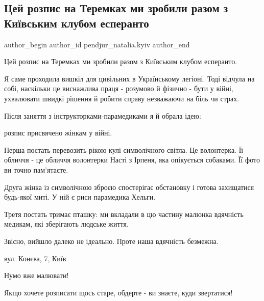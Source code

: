  
 
 
 
 

\subsection{Цей розпис на Теремках ми зробили разом з Київським клубом есперанто}
\label{sec:17_07_2023.fb.pendjur_natalia.kyiv.1.rozpys_na_teremkah_kyiv_klub_esperanto}

\ifcmt
 author_begin
   author_id pendjur_natalia.kyiv
 author_end
\fi

Цей розпис на Теремках ми зробили разом з Київським клубом есперанто. 

Я саме проходила вишкіл для цивільних в Українському легіоні. Тоді відчула на
собі, наскільки це виснажлива праця - розумово й фізично - бути у війні,
ухвалювати швидкі рішення й робити справу незважаючи на біль чи страх. 

Після заняття з інструкторками-парамедиками я й обрала ідею:

розпис присвячено жінкам у війні. 

Перша постать перевозить рікою кулі символічного світла. Це волонтерка. Її
обличчя - це обличчя волонтерки Насті з Ірпеня, яка опікується собаками. Її
фото ви точно пам'ятаєте. 

Друга жінка із символічною зброєю спостерігає обстановку і готова захищатися
будь-якої миті. У ній є риси парамедика Хельги.  

Третя постать тримає пташку: ми вкладали в цю частину малюнка вдячність
медикам, які зберігають людське життя. 

Звісно, вийшло далеко не ідеально. Проте наша вдячність безмежна. 

вул. Конєва, 7, Київ

Нумо вже малювати! 

Якщо хочете розписати щось старе, обдерте - ви знаєте, куди звертатися!
